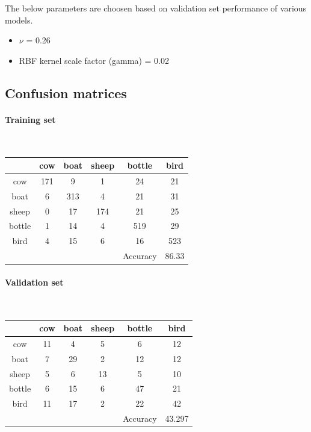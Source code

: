 \documentclass[fleqn]{article}
\newcommand{\myparagraph}[1]{\paragraph{#1}\mbox{}\\}
\begin{document}
The below parameters are choosen based on validation set performance of various models.

\begin{itemize}
  \item $\nu$ = 0.26
  \item RBF kernel scale factor (gamma) = 0.02
\end{itemize}

\subsection{Confusion matrices}
\myparagraph{Training set}
\begin{center}
  \begin{longtable}{ c | c | c | c | c | c }
  	\multicolumn{1}{c}{} &
	\multicolumn{1}{c}{cow} & 
	\multicolumn{1}{c}{boat } & 
	\multicolumn{1}{c}{sheep } &
	\multicolumn{1}{c}{bottle } & 
	\multicolumn{1}{c}{bird } \\
    \hline
    cow       &  	171  &  9 	&  	1  	& 24 	& 21		\\\hline 
    boat      & 	6 	 & 	313 & 	4 	& 21 	& 31		\\\hline
    sheep     &  	0  	& 	17  & 	174 & 21 	& 25\\\hline
    bottle    &  	1 	& 	14 	& 	4 	& 519 	& 29\\\hline
    bird      & 	4 	& 	15	&   6 	& 16	& 523\\\hline
              &        &      &        &   Accuracy 	& 86.33\\\hline
  \end{longtable}
\end{center}

\myparagraph{Validation set}

\begin{center}
  \begin{longtable}{ c | c | c | c | c | c }
  	\multicolumn{1}{c}{} &
	\multicolumn{1}{c}{cow} & 
	\multicolumn{1}{c}{boat } & 
	\multicolumn{1}{c}{sheep } &
	\multicolumn{1}{c}{bottle } & 
	\multicolumn{1}{c}{bird } \\
    \hline
    cow       &  	11  &   4 	&  	5  	& 6 	& 12		\\\hline 
    boat      & 	7 	 & 	29 & 	2 	& 12 	& 12		\\\hline
    sheep     &  	5  	& 	6  & 	13 & 5 	& 10\\\hline
    bottle    &  	6 	& 	15 	& 	6 	& 47 	& 21\\\hline
    bird      & 	11 	& 	17	&   2 	& 22	& 42\\\hline
              &        &      &        &   Accuracy 	& 43.297\\\hline
  \end{longtable}
\end{center}
 
\end{document}
